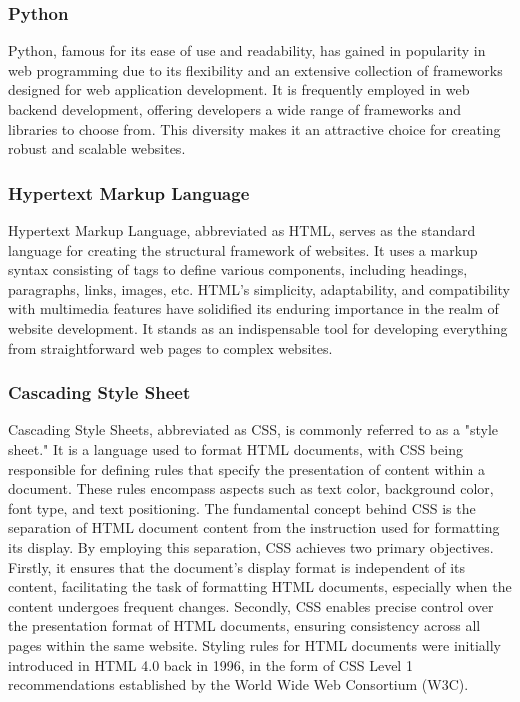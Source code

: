 \documentclass[12pt,oneside,openright,a4paper]{cpe-english-project}
\begin{document}
      \subsubsection{Python}
        \qquad Python, famous for its ease of use and readability, has gained in popularity in web programming due to its flexibility and an extensive collection of frameworks designed for web application development. It is frequently employed in web backend development, offering developers a wide range of frameworks and libraries to choose from. This diversity makes it an attractive choice for creating robust and scalable websites.\par
  
      \subsubsection{Hypertext Markup Language}
        \qquad Hypertext Markup Language, abbreviated as HTML, serves as the standard language for creating the structural framework of websites. It uses a markup syntax consisting of tags to define various components, including headings, paragraphs, links, images, etc. HTML’s simplicity, adaptability, and compatibility with multimedia features have solidified its enduring importance in the realm of website development. It stands as an indispensable tool for developing everything from straightforward web pages to complex websites.\par
  
      \subsubsection{Cascading Style Sheet}
        \qquad Cascading Style Sheets, abbreviated as CSS, is commonly referred to as a "style sheet." It is a language used to format HTML documents, with CSS being responsible for defining rules that specify the presentation of content within a document. These rules encompass aspects such as text color, background color, font type, and text positioning. The fundamental concept behind CSS is the separation of HTML document content from the instruction used for formatting its display. By employing this separation, CSS achieves two primary objectives. Firstly, it ensures that the document's display format is independent of its content, facilitating the task of formatting HTML documents, especially when the content undergoes frequent changes. Secondly, CSS enables precise control over the presentation format of HTML documents, ensuring consistency across all pages within the same website. Styling rules for HTML documents were initially introduced in HTML 4.0 back in 1996, in the form of CSS Level 1 recommendations established by the World Wide Web Consortium (W3C).\par
    
\end{document}
